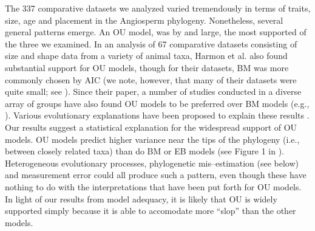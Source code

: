 \documentclass[a4paper,12pt]{article}
\begin{document}
The 337 comparative datasets we analyzed varied tremendously in terms of traits, size, age and placement in the Angiosperm phylogeny. Nonetheless, several general patterns emerge. An OU model, was by and large, the most supported of the three we examined. In an analysis of 67 comparative datasets consisting of size and shape data from a variety of animal taxa, Harmon et al. \citep{Harmon2010} also found substantial support for OU models, though for their datasets, BM was more commonly chosen by AIC (we note, however, that many of their datasets were quite small; see \citep{SlaterPennell}). Since their paper, a number of studies conducted in a diverse array of groups have also found OU models to be preferred over BM models (e.g., \citep{Burbrink2012, Wiens2013, Lopez2013}). Various evolutionary explanations have been proposed to explain these results \citep{HansenMartins1996, ButlerKing2004, Hansen2012book, PennellHarmon}. Our results suggest a statistical explanation for the widespread support of OU models. OU models predict higher variance near the tips of the phylogeny (i.e., between closely related taxa) than do BM or EB models (see Figure 1 in \citep{Harmon2010}). Heterogeneous evolutionary processes, phylogenetic mis--estimation (see below) and measurement error \citep{Houle2011, Hansen2012} could all produce such a pattern, even though these have nothing to do with the interpretations that have been put forth for OU models. In light of our results from model adequacy, it is likely that OU is widely supported simply because it is able to accomodate more ``slop'' than the other models.
\end{document}
